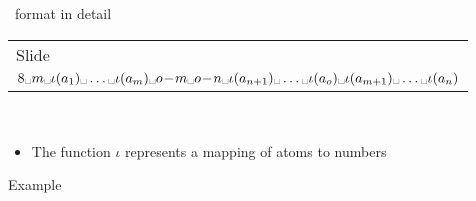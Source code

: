 \begin{frame}[c]{\smodels\ format in detail}
\begin{tabular}{|l|}
      Slide~\pageref{eqn:rule:disjunctive}
      \\
      \(
      8\myspace
      m\myspace
      \iota(a_1)\myspace\dots\myspace\iota(a_{m})\myspace
      o\!-\!m\myspace
      o\!-\!n\myspace
      \iota(a_{n+1})\myspace\dots\myspace\iota(a_{o})\myspace
      \iota(a_{m+1})\myspace\dots\myspace\iota(a_{n})
      \)
      \\
      \hline
    \end{tabular}
    \\
    \medskip
    \normalsize
    \begin{itemize}
    \item<1-> The function $\iota$ represents a mapping of atoms to numbers
    \end{itemize}
\end{frame}
\begin{frame}[fragile,c]{Example}
\begin{center}
{\begin{minipage}[t]{0.3\textwidth}
%
\end{minipage}}%
\qquad\pause\qquad%
{\begin{minipage}[t]{0.3\textwidth}
%
\end{minipage}}%
\end{center}
\end{frame}
%
